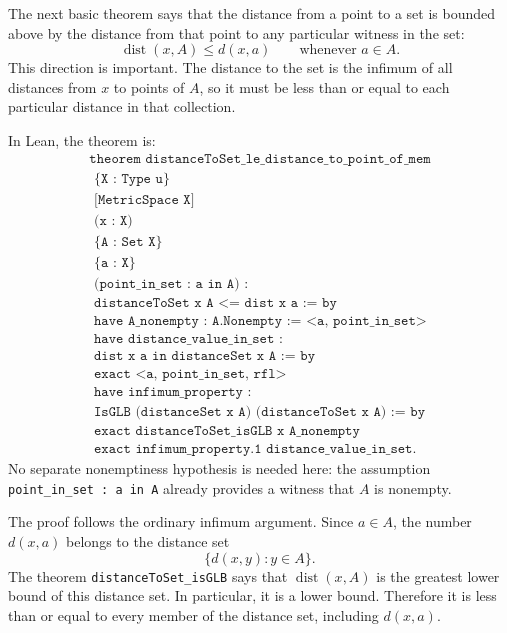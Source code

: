 \begin{remark*}
The next basic theorem says that the distance from a point to a set is bounded
above by the distance from that point to any particular witness in the set:
\[
  \operatorname{dist}(x,A) \le d(x,a)
  \qquad\text{whenever } a \in A.
\]
This direction is important. The distance to the set is the infimum of all
distances from \(x\) to points of \(A\), so it must be less than or equal to
each particular distance in that collection.

In Lean, the theorem is:
\[
\begin{gathered}
  \texttt{theorem distanceToSet\_le\_distance\_to\_point\_of\_mem}\\
  \texttt{\ \ \ \ \{X : Type u\}}\\
  \texttt{\ \ \ \ [MetricSpace X]}\\
  \texttt{\ \ \ \ (x : X)}\\
  \texttt{\ \ \ \ \{A : Set X\}}\\
  \texttt{\ \ \ \ \{a : X\}}\\
  \texttt{\ \ \ \ (point\_in\_set : a in A) :}\\
  \texttt{\ \ \ \ distanceToSet x A <= dist x a := by}\\
  \texttt{\ \ have A\_nonempty : A.Nonempty := <a, point\_in\_set>}\\
  \texttt{\ \ have distance\_value\_in\_set :}\\
  \texttt{\ \ \ \ dist x a in distanceSet x A := by}\\
  \texttt{\ \ \ \ exact <a, point\_in\_set, rfl>}\\
  \texttt{\ \ have infimum\_property :}\\
  \texttt{\ \ \ \ IsGLB (distanceSet x A) (distanceToSet x A) := by}\\
  \texttt{\ \ \ \ exact distanceToSet\_isGLB x A\_nonempty}\\
  \texttt{\ \ exact infimum\_property.1 distance\_value\_in\_set.}
\end{gathered}
\]
No separate nonemptiness hypothesis is needed here: the assumption
\texttt{point\_in\_set : a in A} already provides a witness that \(A\) is
nonempty.

The proof follows the ordinary infimum argument. Since \(a \in A\), the number
\(d(x,a)\) belongs to the distance set
\[
  \{d(x,y) : y \in A\}.
\]
The theorem \texttt{distanceToSet\_isGLB} says that
\(\operatorname{dist}(x,A)\) is the greatest lower bound of this distance set.
In particular, it is a lower bound. Therefore it is less than or equal to every
member of the distance set, including \(d(x,a)\).


\end{remark*}
